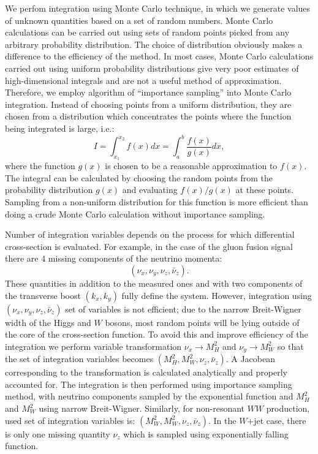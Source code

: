 \documentclass{cmspaper}
\begin{document}
We perfom integration using Monte Carlo technique, in which we generate values of unknown quantities based on a set of random numbers.
Monte Carlo calculations can be carried out using sets of random points picked from any arbitrary probability distribution. The choice 
of distribution obviously makes a difference to the efficiency of the method. In most cases, Monte Carlo calculations carried out 
using uniform probability distributions give very poor estimates of high-dimensional integrals and are not a useful method of approximation. 
Therefore, we employ algorithm of ``importance sampling'' into Monte Carlo integration. Instead of choosing points from a uniform distribution, 
they are chosen from a distribution which concentrates the points where the function being integrated is large, i.e.:
\begin{equation}
\label{eqn:ImpSampling}
I=\int_{x_{1}}^{x_{2}} f(x)dx = \int_{a}^{b} \frac{f(x)}{g(x)}dx,
\end{equation}
where the function $g(x)$ is chosen to be a reasonable approximation to $f(x)$. The integral can be calculated by choosing the random points 
from the probability distribution $g(x)$ and evaluating $f(x)/g(x)$ at these points.  Sampling from a non-uniform distribution for this function 
is more efficient than doing a crude Monte Carlo calculation without importance sampling.

Number of integration variables depends on the process for which differential cross-section is evaluated. For example, in the case of the
gluon fusion signal there are 4 missing components of the neutrino momenta:
\begin{equation}
\label{eqn:MissingInfo}
(\nu_{x}, \nu_{y}, \nu_{z}, \bar{\nu}_{z}).
\end{equation}
 These quantities in addition to the measured ones and with two components of the transverse boost $(k_{x},k_{y})$ fully define the system. However, 
integration using  $(\nu_{x}, \nu_{y}, \nu_{z}, \bar{\nu}_{z})$ set of variables is not efficient; due to the narrow Breit-Wigner width of 
the Higgs and $W$ bosons, most random points will be lying outside of the core of the cross-section function. To avoid this and improve 
efficiency of the integration we perform variable transformation $\nu_{x} \rightarrow M_{H}^{2}$ and $\nu_{y} \rightarrow M_{W}^{2}$ 
so that the set of integration variables becomes
$(M_{H}^{2}, M_{W}^{2}, \nu_{z}, \bar{\nu}_{z})$. A Jacobean corresponding to the transformation is calculated analytically and properly 
accounted for. The integration is then performed using importance sampling method, with neutrino components sampled by the exponential function and 
$M_{H}^{2}$ and $M_{W}^{2}$ using narrow Breit-Wigner. Similarly, for non-resonant $WW$ production, used set of integration variables is:
$(M_{W}^{2}, M_{W}^{2}, \nu_{z}, \bar{\nu}_{z})$. In the $W$+jet case, there is only one missing quantity $\nu_{z}$ which is sampled using 
exponentially falling function.
\end{document}
